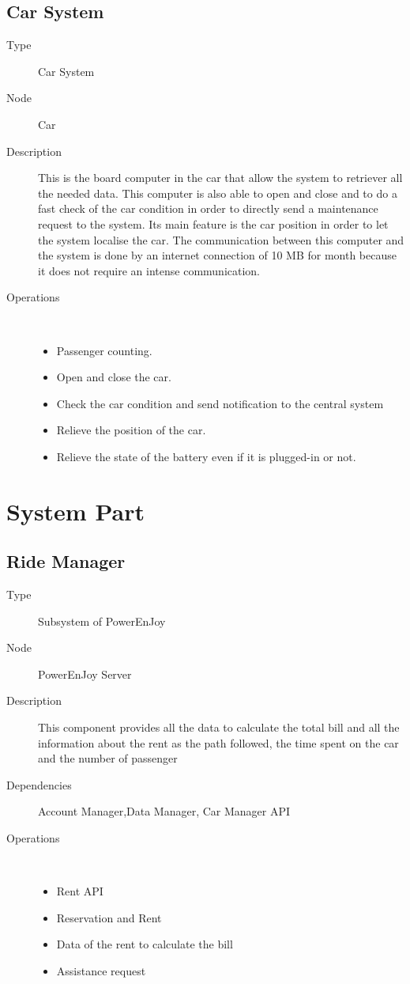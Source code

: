 \subsection{Car System}
\begin{description}
	\item[Type] Car System
	\item[Node] Car
	\item[Description] This is the board computer in the car that allow the system to retriever all the needed data. This computer is also able to open and close and to do a fast check of the car condition in order to directly send a maintenance request to the system. Its main feature is the car position in order to let the system localise the car. The communication between this computer and the system is done by an internet connection of 10 MB for month because it does not require an intense communication.
	\item[Operations] \ \\
		\begin{itemize}
			\item Passenger counting.
			\item Open and close the car.
			\item Check the car condition and send notification to the central system
			\item Relieve the position of the car.
			\item Relieve the state of the battery even if it is plugged-in or not. 
		\end{itemize}
\end{description}


\section{System Part}
\subsection{Ride Manager}
\begin{description}
	\item[Type] Subsystem of PowerEnJoy
	\item[Node] PowerEnJoy Server
	\item[Description] This component provides all the data to calculate the total bill and all the information about the rent as the path followed, the time spent on the car and the number of passenger
	\item[Dependencies] Account Manager,Data Manager, Car Manager API
	\item[Operations] \ \\
		\begin{itemize}
			\item Rent API
			\item Reservation and Rent 
			\item Data of the rent to calculate the bill
			\item Assistance request
	\end{itemize}
\end{description}

